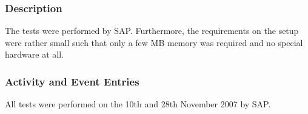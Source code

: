 




\subsubsection{Description}
The tests were performed by SAP. Furthermore, the requirements on the setup were rather small such that only a few MB memory was required and no special hardware at all.


\subsubsection{Activity and Event Entries}
All tests were performed on the 10th and 28th November 2007 by SAP.

